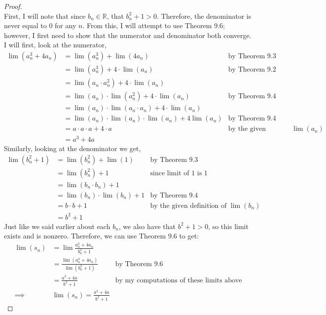 \documentclass[10pt,a4paper]{article}
\theoremstyle{definition}
\begin{document}
\begin{proof}{$ $}
\\First, I will note that since $b_n \in \mathbb{R}$, that $b_n^2 + 1 > 0$. Therefore, the denominator is never equal to 0 for any $n$. From this, I will attempt to use Theorem 9.6; however, I first need to show that the numerator and denominator both converge. I will first, look at the numerator,
\begin{align*}
\lim(a_n^3 + 4a_n) &= \lim(a_n^3) + \lim(4a_n) &\text{by Theorem 9.3}\\
&= \lim(a_n^3) + 4\cdot \lim(a_n) &\text{by Theorem 9.2}\\
&= \lim(a_n\cdot a_n^2) + 4 \cdot \lim(a_n)\\
&= \lim(a_n)\cdot \lim(a_n^2) + 4\cdot \lim(a_n) &\text{by Theorem 9.4}\\
&= \lim(a_n)\cdot \lim(a_n \cdot a_n) + 4\cdot \lim(a_n)\\
&= \lim(a_n) \cdot \lim(a_n) \cdot \lim(a_n) + 4\lim(a_n) &\text{by Theorem 9.4}\\
&= a \cdot a \cdot a + 4\cdot a &\text{by the given definition of }\lim(a_n)\\
&= a^3 + 4a
\end{align*}
Similarly, looking at the denominator we get,
\begin{align*}
\lim(b_n^2 + 1) &= \lim(b_n^2) + \lim(1) &\text{by Theorem 9.3}\\
&= \lim(b_n^2) + 1 &\text{since limit of 1 is 1}\\
&= \lim(b_n \cdot b_n) + 1\\
&= \lim(b_n) \cdot \lim(b_n) + 1 &\text{by Theorem 9.4}\\
&= b \cdot b + 1 &\text{by the given definition of }\lim(b_n)\\
&= b^2 + 1
\end{align*}
Just like we said earlier about each $b_n$, we also have that $b^2 + 1 > 0$, so this limit exists and is nonzero. Therefore, we can use Theorem 9.6 to get:
\begin{align*}
\lim(s_n) &= \lim \frac{a_n^3 + 4a_n}{b_n^2 + 1}\\
&= \frac{\lim(a_n^3 + 4a_n)}{\lim(b_n^2 + 1)} &\text{by Theorem 9.6}\\
&= \frac{a^3 + 4a}{b^2 + 1} &\text{by my computations of these limits above}\\
\implies &\boxed{\lim(s_n) = \frac{a^3 + 4a}{b^2 + 1}}
\end{align*}
\end{proof}
\end{document}
